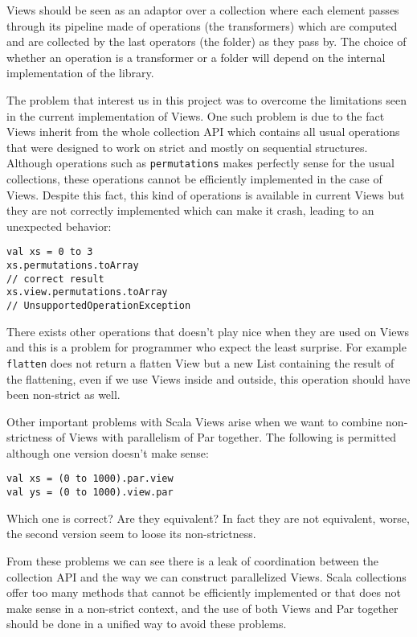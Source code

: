 \documentclass[a4paper,12pt,twocolumn]{article}
\begin{document}
Views should be seen as an adaptor over a collection where each element passes through its pipeline made of operations (the transformers) which are computed and are collected by the last operators (the folder) as they pass by.
The choice of whether an operation is a transformer or a folder will depend on the internal implementation of the library.

The problem that interest us in this project was to overcome the limitations seen in the current implementation of Views.
One such problem is due to the fact Views inherit from the whole collection API which contains all usual operations that were designed to work on strict and mostly on sequential structures.
Although operations such as \verb|permutations| makes perfectly sense for the usual collections, these operations cannot be efficiently implemented in the case of Views.
Despite this fact, this kind of operations is available in current Views but they are not correctly implemented which can make it crash, leading to an unexpected behavior:

\begin{lstlisting}
val xs = 0 to 3
xs.permutations.toArray
// correct result
xs.view.permutations.toArray
// UnsupportedOperationException
\end{lstlisting}

There exists other operations that doesn't play nice when they are used on Views and this is a problem for programmer who expect the least surprise.
For example \verb|flatten| does not return a flatten View but a new List containing the result of the flattening, even if we use Views inside and outside, this operation should have been non-strict as well.

Other important problems with Scala Views arise when we want to combine non-strictness of Views with parallelism of Par together.
The following is permitted although one version doesn't make sense:

\begin{lstlisting}
val xs = (0 to 1000).par.view
val ys = (0 to 1000).view.par
\end{lstlisting}

Which one is correct? Are they equivalent? In fact they are not equivalent, worse, the second version seem to loose its non-strictness.

From these problems we can see there is a leak of coordination between the collection API and the way we can construct parallelized Views.
Scala collections offer too many methods that cannot be efficiently implemented or that does not make sense in a non-strict context, and the use of both Views and Par together should be done in a unified way to avoid these problems.
\end{document}
